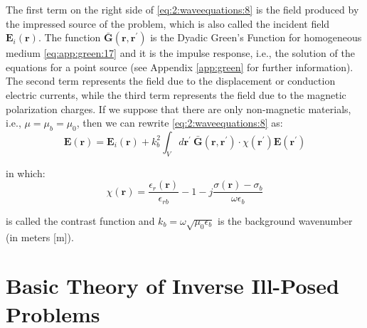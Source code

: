		The first term on the right side of \eqref{eq:2:waveequations:8} is the field produced by the impressed source of the problem, which is also called the incident field $\mathbf{E}_i(\mathbf{r})$. The function $\mathbf{\bar{G}}(\mathbf{r},\mathbf{r^\prime})$ is the Dyadic Green's Function for homogeneous medium \eqref{eq:app:green:17} and it is the impulse response, i.e., the solution of the equations for a point source (see Appendix \ref{app:green} for further information). The second term represents the field due to the displacement or conduction electric currents, while the third term represents the field due to the magnetic polarization charges. If we suppose that there are only non-magnetic materials, i.e., $\mu = \mu_b = \mu_0$, then we can rewrite \eqref{eq:2:waveequations:8} as:
		\begin{equation}
			\mathbf{E}(\mathbf{r}) = \mathbf{E}_i(\mathbf{r}) + k_b^2\int_V d\mathbf{r^\prime}~\mathbf{\bar{G}}(\mathbf{r},\mathbf{r^\prime})\cdot\chi(\mathbf{r^\prime})\mathbf{E}(\mathbf{r^\prime}) \label{eq:2:waveequations:final}
		\end{equation}
	
		\noindent in which:
		\begin{equation}
			\chi(\mathbf{r}) = \frac{\epsilon_r(\mathbf{r})}{\epsilon_{rb}}-1-j\frac{\sigma(\mathbf{r})-\sigma_b}{\omega\epsilon_b} \label{eq:2:contrast}
		\end{equation}
	
		\noindent is called the contrast function and $k_b = \omega\sqrt{\mu_0\epsilon_b}$ is the background wavenumber (in meters [m]).
	
	\section{Basic Theory of Inverse Ill-Posed Problems}\label{chap:problemstatement:inverse}
	
